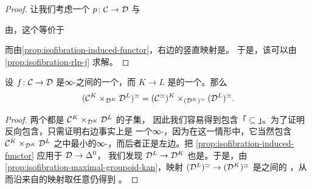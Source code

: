 \begin{proof}
让我们考虑一个\trInnerFibration{} $p\colon \mathcal{C} \to \mathcal{D}$ 与\trLiftingProblem{}%
\begin{center}
\end{center}
由\trAdjunction{}，这个\trLiftingProblem{}等价于\trLiftingProblem{}%
\begin{center}
\end{center}
而由\cref{prop:isofibration-induced-functor}，右边的竖直映射是\trIsofibration{}。
于是，该\trLiftingProblem{}可以由\cref{prop:isofibration-rlp-j} 求解。
\end{proof}

\begin{corollary}\label{cor:equivalences-in-functor-pullback}
设 $f\colon \mathcal{C} \to \mathcal{D}$ 是∞-\trCategories{}之间的一个\trFunctor{}，而
$K \to L$ 是\trSimplicialSets{}的一个\trMonomorphism{}。那么
\[
(\mathcal{C}^K \times_{\mathcal{D}^K} \mathcal{D}^L)^{\simeq} = (\mathcal{C}^{\simeq})^K \times_{(\mathcal{D}^K)^{\simeq}} (\mathcal{D}^L)^{\simeq}.
\]
\end{corollary}

\begin{proof}
两个\trSimplicialSets{}都是\trPullback{} $\mathcal{C}^K \times_{\mathcal{D}^K} \mathcal{D}^L$ 的子集，
因此我们容易得到包含「$\subseteq$」。为了证明反向包含，只需证明右边事实上是
一个∞-\trGroupoid{}，因为在这一情形中，它当然包含
$\mathcal{C}^K \times_{\mathcal{D}^K} \mathcal{D}^L$ 之中最小的∞-\trGroupoid{}，而后者正是左边。把%
\cref{prop:isofibration-induced-functor} 应用于\trIsofibration{} $\mathcal{D} \to \Delta^0$，
我们发现 $\mathcal{D}^L \to \mathcal{D}^K$ 也是\trIsofibration{}。于是，由
\cref{prop:isofibration-maximal-groupoid-kan}，映射
$(\mathcal{D}^L)^{\simeq} \to (\mathcal{D}^K)^{\simeq}$ 是\trKanComplex{}之间的%
\trKanFibration{}，从而沿来自\trKanComplex{}的映射取任意\trPullback{}仍得到%
\trKanComplex{}。
\end{proof}

